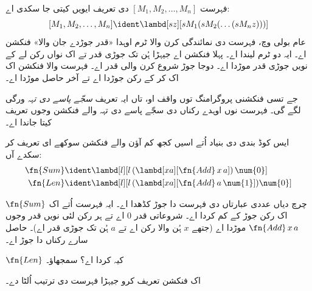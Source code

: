 \documentclass[../../../include/open-logic-section]{subfiles}
\begin{document}

فہرست $[M_1, M_2, \ldots, M_n]$ دی تعریف ایویں کیتی جا سکدی اے:
\[
  [M_1, M_2, \ldots, M_n] \ident \lambd[sz][s M_1 (s M_2 (\ldots (s M_n z)))]
\]
عام بولی وچ، فہرست دی نمائندگی کرن والا ٹرم اوہدا «قدر جوڑدے جان والا» فنکشن اے۔ ایہ دو ٹرم لیندا اے۔ پہلا فنکشن اے جیہڑا ہُن تک جوڑی قدر تے اک نواں رکن لے کے نویں جوڑی قدر موڑدا اے۔ دوجا جوڑ شروع کرن والی قدر اے۔ فہرست والا فنکشن اک اک کر کے رکن جوڑدا اے تے آخر حاصل موڑدا اے۔

\begin{digress}
  جے تسی فنکشنی پروگرامنگ توں واقف او، تاں ایہ تعریف \emph{سجّے پاسے دی تہہ} ورگی لگے گی۔ فہرست نوں اوہدے رکناں دی سجّے پاسے دی تہہ والے فنکشن وجوں تعریف کیتا جاندا اے۔
\end{digress}

ایس کوڈ بندی دی بنیاد اُتے اسیں کجھ کم آؤن والے فنکشن سوکھے ای تعریف کر سکدے آں:
\begin{align*}
  \fn{Sum} & \ident
  \lambd[l][l \, (\lambd[xa][\fn{Add} \, x \, a])\,  \num{0}]\\
  \fn{Len} & \ident
  \lambd[l][l \, (\lambd[xa][\fn{Add} \, a \, \num{1}]) \num{0}]
\end{align*}

$\fn{Sum}$ چرچ دیاں عددی عبارتاں دی فہرست دا جوڑ کڈھدا اے۔ ایہ فہرست اُتے اک اک رکن جوڑ کے کم کردا اے۔ شروعاتی قدر $\num{0}$ اے تے ہر رکن لئی نویں قدر وجوں $\fn{Add} \, x\, a$ موڑدا اے (جتھے $x$ ہُن والا رکن اے تے $a$ ہُن تک جوڑی قدر اے)۔ حاصل سارے رکناں دا جوڑ اے۔

\begin{prob}
  $\fn{Len}$ کیہ کردا اے؟ سمجھاؤ۔
\end{prob}

\begin{prob}
  اک فنکشن تعریف کرو جیہڑا فہرست دی ترتیب اُلٹا دے۔
\end{prob}
\end{document}
